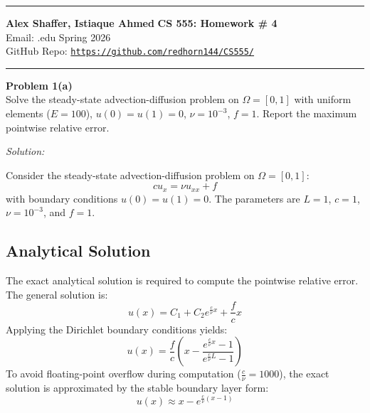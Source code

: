 \documentclass[11pt]{article}
\newcommand{\yourname}{Alex Shaffer, Istiaque Ahmed}
\newcommand{\hwnum}{4}
\newenvironment{problem}[2][Problem]
    { \begin{mdframed}[backgroundcolor=gray!20] \textbf{#1 #2} \\}
    {  \end{mdframed}}
\newenvironment{solution}
    {\textit{Solution:}}
    {}
\begin{document}
\noindent
\noindent\rule{\linewidth}{2pt}
\large\textbf{\yourname} \hfill \textbf{CS 555: Homework \# \hwnum}   \\
Email: \yournetid@illinois.edu \hfill Spring 2026\\
GitHub Repo: \texttt{\url{https://github.com/redhorn144/CS555/}} \\
\noindent\rule{\linewidth}{2pt}

\begin{problem}{1(a)}
Solve the steady-state advection-diffusion problem on $\Omega=[0,1]$ with uniform elements ($E=100$),
$u(0)=u(1)=0$, $\nu=10^{-3}$, $f=1$. Report the maximum pointwise relative error.
\end{problem}

\begin{solution}

Consider the steady-state advection-diffusion problem on $\Omega = [0,1]$:
\begin{equation}
    c u_x = \nu u_{xx} + f
\end{equation}
with boundary conditions $u(0) = u(1) = 0$. The parameters are $L=1$, $c=1$, $\nu=10^{-3}$, and $f=1$.

\subsection*{Analytical Solution}
The exact analytical solution is required to compute the pointwise relative error. The general solution is:
\begin{equation}
    u(x) = C_1 + C_2 e^{\frac{c}{\nu}x} + \frac{f}{c}x
\end{equation}
Applying the Dirichlet boundary conditions yields:
\begin{equation}
    u(x) = \frac{f}{c} \left( x - \frac{e^{\frac{c}{\nu}x} - 1}{e^{\frac{c}{\nu}L} - 1} \right)
\end{equation}
To avoid floating-point overflow during computation ($\frac{c}{\nu} = 1000$), the exact solution is approximated by the stable boundary layer form:
\begin{equation}
    u(x) \approx x - e^{\frac{c}{\nu}(x - 1)}
\end{equation}


\end{solution}
\end{document}
